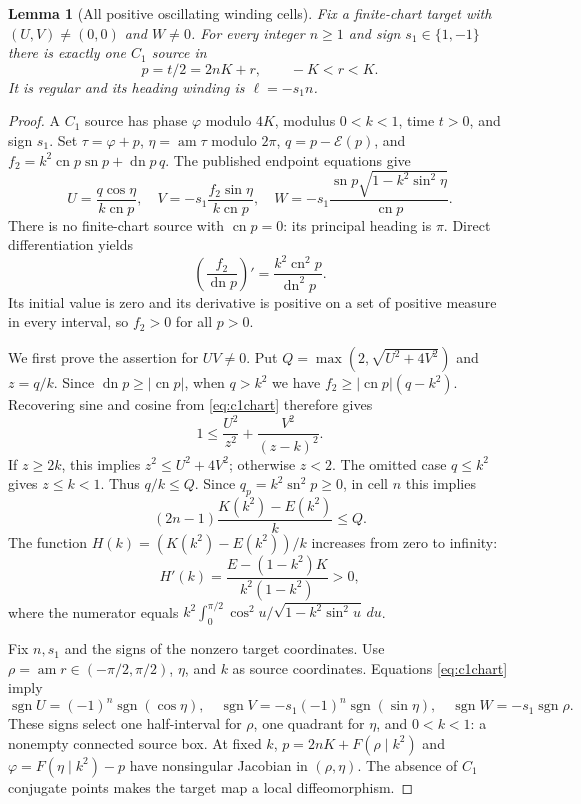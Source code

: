 \documentclass[11pt,a4paper]{article}
\newtheorem{lemma}[theorem]{Lemma}
\theoremstyle{remark}\newtheorem{remark}[theorem]{Remark}
\newcommand{\sn}{\operatorname{sn}}
\newcommand{\cn}{\operatorname{cn}}
\newcommand{\dn}{\operatorname{dn}}
\begin{document}
\begin{lemma}[All positive oscillating winding cells]\label{lem:c1cells}
Fix a finite-chart target with $(U,V)\ne(0,0)$ and $W\ne0$.
For every integer $n\ge1$ and sign $s_1\in\{1,-1\}$ there is exactly
one $C_1$ source in
\[
 p=t/2=2nK+r,\qquad -K<r<K.
\]
It is regular and its heading winding is $\ell=-s_1n$.
\end{lemma}
\begin{proof}
A $C_1$ source has phase $\varphi$ modulo $4K$, modulus $0<k<1$,
time $t>0$, and sign $s_1$. Set
$\tau=\varphi+p$, $\eta=\operatorname{am}\tau$ modulo $2\pi$,
$q=p-\mathcal E(p)$, and
$f_2=k^2\cn p\sn p+\dn p\,q$.
The published endpoint equations give
\begin{equation}\label{eq:c1chart}
 U=\frac{q\cos\eta}{k\cn p},\quad
 V=-s_1\frac{f_2\sin\eta}{k\cn p},\quad
 W=-s_1\frac{\sn p\sqrt{1-k^2\sin^2\eta}}{\cn p}.
\end{equation}
There is no finite-chart source with $\cn p=0$: its principal heading is
$\pi$. Direct differentiation yields
\[
 \left(\frac{f_2}{\dn p}\right)'=\frac{k^2\cn^2p}{\dn^2p}.
\]
Its initial value is zero and its derivative is positive on a set of
positive measure in every interval, so $f_2>0$ for all $p>0$.

We first prove the assertion for $UV\ne0$. Put
$Q=\max(2,\sqrt{U^2+4V^2})$ and $z=q/k$.
Since $\dn p\ge|\cn p|$, when $q>k^2$ we have
$f_2\ge|\cn p|(q-k^2)$. Recovering sine and cosine from
\eqref{eq:c1chart} therefore gives
\[
 1\le\frac{U^2}{z^2}+\frac{V^2}{(z-k)^2}.
\]
If $z\ge2k$, this implies $z^2\le U^2+4V^2$; otherwise $z<2$.
The omitted case $q\le k^2$ gives $z\le k<1$. Thus $q/k\le Q$.
Since $q_p=k^2\sn^2p\ge0$, in cell $n$ this implies
\begin{equation}\label{eq:c1bound}
 (2n-1)\frac{K(k^2)-E(k^2)}k\le Q.
\end{equation}
The function $H(k)=(K(k^2)-E(k^2))/k$ increases from zero to infinity:
\[
 H'(k)=\frac{E-(1-k^2)K}{k^2(1-k^2)}>0,
\]
where the numerator equals
$k^2\int_0^{\pi/2}\cos^2u/\sqrt{1-k^2\sin^2u}\,du$.

Fix $n,s_1$ and the signs of the nonzero target coordinates. Use
$\rho=\operatorname{am}r\in(-\pi/2,\pi/2)$, $\eta$, and $k$ as source
coordinates. Equations \eqref{eq:c1chart} imply
\[
 \operatorname{sgn}U=(-1)^n\operatorname{sgn}(\cos\eta),\quad
 \operatorname{sgn}V=-s_1(-1)^n\operatorname{sgn}(\sin\eta),\quad
 \operatorname{sgn}W=-s_1\operatorname{sgn}\rho.
\]
These signs select one half-interval for $\rho$, one quadrant for
$\eta$, and $0<k<1$: a nonempty connected source box. At fixed $k$,
$p=2nK+F(\rho\mid k^2)$ and
$\varphi=F(\eta\mid k^2)-p$ have nonsingular Jacobian in
$(\rho,\eta)$. The absence of $C_1$ conjugate points
\cite[Theorem 2.1]{SC} makes the target map a local diffeomorphism.


\end{proof}
\end{document}
